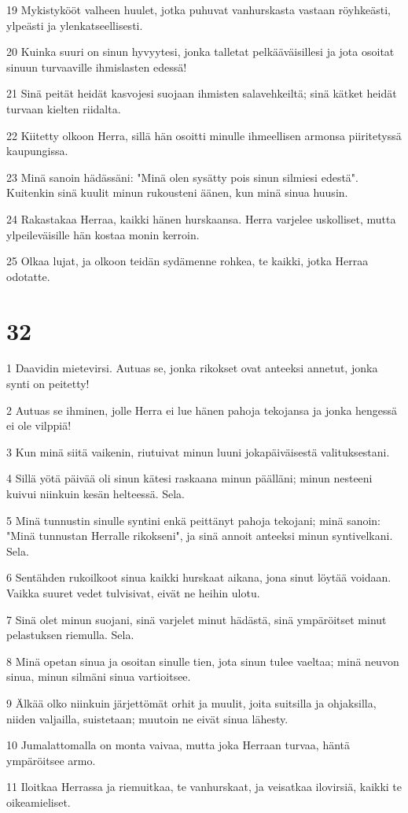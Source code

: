 \par 19 Mykistykööt valheen huulet, jotka puhuvat vanhurskasta vastaan röyhkeästi, ylpeästi ja ylenkatseellisesti.
\par 20 Kuinka suuri on sinun hyvyytesi, jonka talletat pelkääväisillesi ja jota osoitat sinuun turvaaville ihmislasten edessä!
\par 21 Sinä peität heidät kasvojesi suojaan ihmisten salavehkeiltä; sinä kätket heidät turvaan kielten riidalta.
\par 22 Kiitetty olkoon Herra, sillä hän osoitti minulle ihmeellisen armonsa piiritetyssä kaupungissa.
\par 23 Minä sanoin hädässäni: "Minä olen sysätty pois sinun silmiesi edestä". Kuitenkin sinä kuulit minun rukousteni äänen, kun minä sinua huusin.
\par 24 Rakastakaa Herraa, kaikki hänen hurskaansa. Herra varjelee uskolliset, mutta ylpeileväisille hän kostaa monin kerroin.
\par 25 Olkaa lujat, ja olkoon teidän sydämenne rohkea, te kaikki, jotka Herraa odotatte.

\chapter{32}

\par 1 Daavidin mietevirsi. Autuas se, jonka rikokset ovat anteeksi annetut, jonka synti on peitetty!
\par 2 Autuas se ihminen, jolle Herra ei lue hänen pahoja tekojansa ja jonka hengessä ei ole vilppiä!
\par 3 Kun minä siitä vaikenin, riutuivat minun luuni jokapäiväisestä valituksestani.
\par 4 Sillä yötä päivää oli sinun kätesi raskaana minun päälläni; minun nesteeni kuivui niinkuin kesän helteessä. Sela.
\par 5 Minä tunnustin sinulle syntini enkä peittänyt pahoja tekojani; minä sanoin: "Minä tunnustan Herralle rikokseni", ja sinä annoit anteeksi minun syntivelkani. Sela.
\par 6 Sentähden rukoilkoot sinua kaikki hurskaat aikana, jona sinut löytää voidaan. Vaikka suuret vedet tulvisivat, eivät ne heihin ulotu.
\par 7 Sinä olet minun suojani, sinä varjelet minut hädästä, sinä ympäröitset minut pelastuksen riemulla. Sela.
\par 8 Minä opetan sinua ja osoitan sinulle tien, jota sinun tulee vaeltaa; minä neuvon sinua, minun silmäni sinua vartioitsee.
\par 9 Älkää olko niinkuin järjettömät orhit ja muulit, joita suitsilla ja ohjaksilla, niiden valjailla, suistetaan; muutoin ne eivät sinua lähesty.
\par 10 Jumalattomalla on monta vaivaa, mutta joka Herraan turvaa, häntä ympäröitsee armo.
\par 11 Iloitkaa Herrassa ja riemuitkaa, te vanhurskaat, ja veisatkaa ilovirsiä, kaikki te oikeamieliset.


